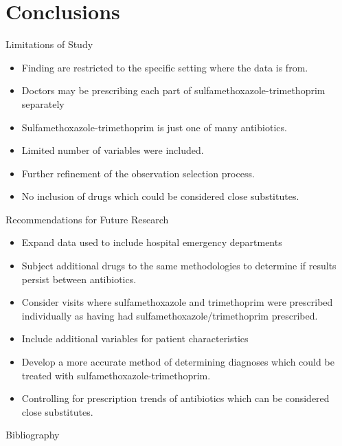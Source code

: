 \documentclass{beamer}
\begin{document}
\section{Conclusions}
\begin{frame}{Limitations of Study}
\begin{itemize}
\item Finding are restricted to the specific setting where the data is from.
\item Doctors may be prescribing each part of sulfamethoxazole-trimethoprim separately
\item Sulfamethoxazole-trimethoprim is just one of many antibiotics.
\item Limited number of variables were included.
\item Further refinement of the observation selection process.
\item No inclusion of drugs which could be considered close substitutes.
\end{itemize}
\end{frame}

\begin{frame}{Recommendations for Future Research}
\begin{itemize}
\item Expand data used to include hospital emergency departments
\item Subject additional drugs to the same methodologies to determine if results persist between antibiotics.
\item Consider visits where sulfamethoxazole and trimethoprim were prescribed individually as having had sulfamethoxazole/trimethoprim prescribed.
\item Include additional variables for patient characteristics
\item Develop a more accurate method of determining diagnoses which could be treated with sulfamethoxazole-trimethoprim.
\item Controlling for prescription trends of antibiotics which can be considered close substitutes.
\end{itemize}
\end{frame}

\begin{frame}[allowframebreaks]{Bibliography}


\end{frame}
\end{document}
